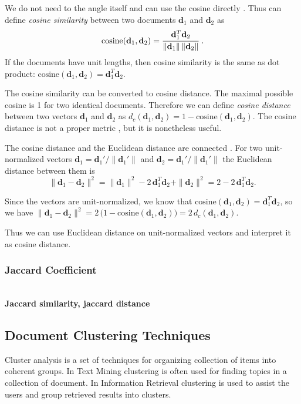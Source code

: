 We do not need to the angle itself and can use the cosine directly
\cite{manning2008introduction}.
Thus can define \emph{cosine similarity} between two documents $\mathbf d_1$ and
$\mathbf d_2$ as
$$\text{cosine}(\mathbf d_1, \mathbf d_2) = \cfrac{\mathbf d_1^T \mathbf d_2}{\|\mathbf d_1 \| \, \| \mathbf d_2 \|} \ .$$
If the documents have unit lengths, then cosine similarity is the same as
dot product: $\text{cosine}(\mathbf d_1, \mathbf d_2) = \mathbf d_1^T \mathbf d_2$.

The cosine similarity can be converted to cosine distance.
The maximal possible cosine
is 1 for two identical documents. Therefore we can define \emph{cosine distance}
between two vectors $\mathbf d_1$ and $\mathbf d_2$ as
$d_c(\mathbf d_1, \mathbf d_2) = 1 - \text{cosine}(\mathbf d_1, \mathbf d_2)$. 
The cosine distance is not a proper metric \cite{korenius2007principal},
but it is nonetheless useful.

The cosine distance and the Euclidean distance are connected \cite{korenius2007principal}.
For two unit-normalized vectors $\mathbf d_1 = \mathbf d_1' / \| \mathbf d_1' \|$ and
$\mathbf d_2 = \mathbf d_1' / \| \mathbf d_1' \|$
the Euclidean distance between them is
$$\| \mathbf d_1 - \mathbf d_2 \|^2 = \| \mathbf d_1 \|^2 - 2 \, \mathbf d_1^T \mathbf d_2 + \| \mathbf d_2 \|^2 = 2 - 2 \, \mathbf d_1^T \mathbf d_2  .$$

Since the vectors are unit-normalized, we know that
$\text{cosine}(\mathbf d_1, \mathbf d_2) = \mathbf d_1^T \mathbf d_2$, so we have
$\| \mathbf d_1 - \mathbf d_2 \|^2 = 2 \, \big(1 - \text{cosine}(\mathbf d_1, \mathbf d_2)\big) = 2 \, d_c(\mathbf d_1, \mathbf d_2)$.


Thus we can use Euclidean distance on unit-normalized vectors
and interpret it as cosine distance.


\subsubsection{Jaccard Coefficient} \ \\

\textbf{Jaccard similarity, jaccard distance}


\subsection{Document Clustering Techniques} \label{sec:doc-clustering}

Cluster analysis is a set of techniques for
organizing collection of items into coherent groups.
In Text Mining clustering is often used for finding topics
in a collection of document.
In Information Retrieval clustering is used to assist the users and group
retrieved results into clusters.


